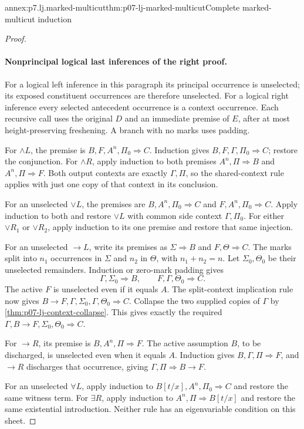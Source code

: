 \begin{annexitem}{annex:p7.lj.marked-multicut}{thm:p07-lj-marked-multicut}{Complete marked-multicut induction}
\begin{proof}
\paragraph{Nonprincipal logical last inferences of the right proof.}
For a logical left inference in this paragraph its principal occurrence
is unselected; its exposed constituent occurrences are therefore
unselected.  For a logical right inference every selected antecedent
occurrence is a context occurrence.  Each recursive call uses the
original \(D\) and an immediate premise of \(E\), after at most
height-preserving freshening.  A branch with no marks uses padding.

For \(\land L\), the premise is
\(B,F,A^n,\Pi_0\Rightarrow C\).  Induction gives
\(B,F,\Gamma,\Pi_0\Rightarrow C\); restore the conjunction.
For \(\land R\), apply induction to both premises
\(A^n,\Pi\Rightarrow B\) and \(A^n,\Pi\Rightarrow F\).
Both output contexts are exactly \(\Gamma,\Pi\), so the shared-context
rule applies with just one copy of that context in its conclusion.

For an unselected \(\lor L\), the premises are
\(B,A^n,\Pi_0\Rightarrow C\) and
\(F,A^n,\Pi_0\Rightarrow C\).  Apply induction to both and
restore \(\lor L\) with common side context \(\Gamma,\Pi_0\).
For either \(\lor R_1\) or \(\lor R_2\), apply induction to
its one premise and restore that same injection.

For an unselected \(\to L\), write its premises as
\(\Sigma\Rightarrow B\) and \(F,\Theta\Rightarrow C\).
The marks split into \(n_1\) occurrences in \(\Sigma\) and
\(n_2\) in \(\Theta\), with \(n_1+n_2=n\).  Let
\(\Sigma_0,\Theta_0\) be their unselected remainders.  Induction
or zero-mark padding gives
\[
 \Gamma,\Sigma_0\Rightarrow B,
 \qquad F,\Gamma,\Theta_0\Rightarrow C.
\]
The active \(F\) is unselected even if it equals \(A\).
The split-context implication rule now gives
\(B\to F,\Gamma,\Sigma_0,\Gamma,\Theta_0\Rightarrow C\).
Collapse the two supplied copies of \(\Gamma\) by
\ref{thm:p07-lj-context-collapse}.  This gives exactly the required
\(\Gamma,B\to F,\Sigma_0,\Theta_0\Rightarrow C\).

For \(\to R\), its premise is \(B,A^n,\Pi\Rightarrow F\).
The active assumption \(B\), to be discharged, is unselected even
when it equals \(A\).  Induction gives
\(B,\Gamma,\Pi\Rightarrow F\), and \(\to R\) discharges
that occurrence, giving \(\Gamma,\Pi\Rightarrow B\to F\).

For an unselected \(\forall L\), apply induction to
\(B[t/x],A^n,\Pi_0\Rightarrow C\) and restore the same witness
term.  For \(\exists R\), apply induction to
\(A^n,\Pi\Rightarrow B[t/x]\) and restore the same existential
introduction.  Neither rule has an eigenvariable condition on this sheet.


\end{proof}
\end{annexitem}
